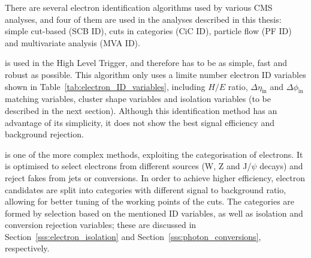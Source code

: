 \newpage

\newpage


There are several electron identification algorithms used by various CMS analyses, and four of them are used in the
analyses described in this thesis: simple cut-based (SCB ID), cuts in categories (CiC ID), particle flow (PF ID) and
multivariate analysis (MVA ID).

\begin{description}[wide=\parindent]
  \item[Simple cut-based ID] \autocite{SCB_ID} is used in the High Level Trigger, and therefore has to be as simple,
fast and robust as possible. This algorithm only uses a limite number electron ID variables shown in
Table~\ref{tab:electron_ID_variables}, including $H/E$ ratio, $\Delta\eta_{\text{in}}$ and $\Delta\phi_{\text{in}}$
matching variables, cluster shape variables and isolation variables (to be described in the next section). Although this
identification method has an advantage of its simplicity, it does not show the best signal efficiency and background
rejection.

 \item[Cuts in categories ID] \autocite{CiC_ID} is one of the more complex methods, exploiting the categorisation of
electrons. It is optimised to select electrons from different sources (W, Z and J/$\psi$ decays) and reject fakes from
jets or conversions. In order to achieve higher efficiency, electron candidates are split into categories with different
signal to background ratio, allowing for better tuning of the working points of the cuts. The categories are formed by
selection based on the mentioned ID variables, as well as isolation and conversion rejection variables; these are
discussed in Section~\ref{sss:electron_isolation} and Section~\ref{sss:photon_conversions}, respectively.




\end{description}
